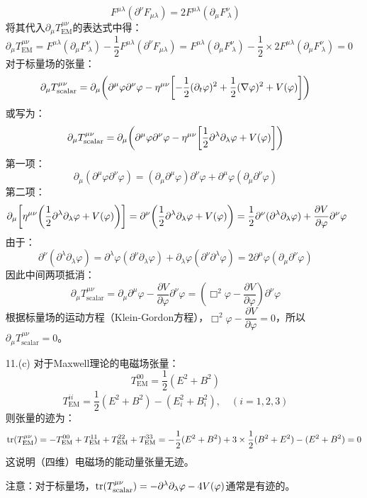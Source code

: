 \documentclass[a4paper]{article}
\begin{document}
\begin{enumerate}
    \[
        F^{\mu\lambda} (\partial^\nu F_{\mu\lambda}) = 2 F^{\mu\lambda} (\partial_\mu F^\nu_{\ \lambda})
    \]
    将其代入$\partial_\mu T_{\mathrm{EM}}^{\mu\nu}$的表达式中得：
    \[
        \partial_\mu T_{\mathrm{EM}}^{\mu\nu} = F^{\mu\lambda} (\partial_\mu F^\nu_{\ \lambda}) - \frac{1}{2} F^{\mu\lambda} (\partial^\nu F_{\mu\lambda}) = F^{\mu\lambda} (\partial_\mu F^\nu_{\ \lambda}) - \frac{1}{2} \times 2 F^{\mu\lambda} (\partial_\mu F^\nu_{\ \lambda}) = 0
    \]
    对于标量场的张量：
    \[
        \partial_\mu T_{\mathrm{scalar}}^{\mu\nu} = \partial_\mu \qty(\partial^\mu \varphi \partial^\nu \varphi - \eta^{\mu\nu} \qty[-\frac{1}{2}(\partial_t \varphi)^2 + \frac{1}{2}(\nabla \varphi)^2 + V(\varphi)])
    \]
    或写为：
    \[
        \partial_\mu T_{\mathrm{scalar}}^{\mu\nu} = \partial_\mu \qty(\partial^\mu \varphi \partial^\nu \varphi - \eta^{\mu\nu} \qty[\frac{1}{2}\partial^\lambda \partial_\lambda \varphi + V(\varphi)])
    \]
    第一项：
    \[
        \partial_\mu (\partial^\mu \varphi \partial^\nu \varphi) = (\partial_\mu \partial^\mu \varphi) \partial^\nu \varphi + \partial^\mu \varphi (\partial_\mu \partial^\nu \varphi)
    \]
    第二项：
    \[
        \partial_\mu \qty[\eta^{\mu\nu} \qty(\frac{1}{2}\partial^\lambda \partial_\lambda \varphi + V(\varphi))] = \partial^\nu \qty(\frac{1}{2}\partial^\lambda \partial_\lambda \varphi + V(\varphi)) = \frac{1}{2}\partial^\nu (\partial^\lambda \partial_\lambda \varphi) + \frac{\partial V}{\partial \varphi} \partial^\nu \varphi
    \]
    由于：
    \[
        \partial^\nu (\partial^\lambda \partial_\lambda \varphi) = \partial^\lambda \varphi (\partial^\nu \partial_\lambda \varphi) + \partial_\lambda \varphi (\partial^\nu \partial^\lambda \varphi) = 2\partial^\mu \varphi (\partial_\mu \partial^\nu \varphi)
    \]
    因此中间两项抵消：
    \[
        \partial_\mu T_{\mathrm{scalar}}^{\mu\nu} = \partial_\mu \partial^\mu \varphi - \frac{\partial V}{\partial \varphi} \partial^\nu \varphi = (\Box^2 \varphi - \frac{\partial V}{\partial \varphi}) \partial^\nu \varphi
    \]
    根据标量场的运动方程（Klein-Gordon方程），$\Box^2 \varphi - \dfrac{\partial V}{\partial \varphi} = 0$，所以$\partial_\mu T_{\mathrm{scalar}}^{\mu\nu} = 0$。

    \bigskip
    \item[11.(c)]
    对于Maxwell理论的电磁场张量：
    \[
        T_{\mathrm{EM}}^{00} = \frac{1}{2}(E^2 + B^2)
    \]
    \[
        T_{\mathrm{EM}}^{ii} = \frac{1}{2}(E^2 + B^2) - (E_i^2 + B_i^2),\quad (i = 1,2,3)
    \]
    则张量的迹为：
    \[
        \tr(T_{\mathrm{EM}}^{\mu\nu}) = -T_{\mathrm{EM}}^{00} + T_{\mathrm{EM}}^{11} + T_{\mathrm{EM}}^{22} + T_{\mathrm{EM}}^{33} = -\frac{1}{2}(E^2 + B^2) + 3 \times \frac{1}{2}(B^2 + E^2) - (E^2 + B^2) = 0
    \]
    这说明（四维）电磁场的能动量张量无迹。

    注意：对于标量场，$\tr(T_{\mathrm{scalar}}^{\mu\nu}) = -\partial^\lambda \partial_\lambda \varphi - 4V(\varphi)$通常是有迹的。
\end{enumerate}
\end{document}
